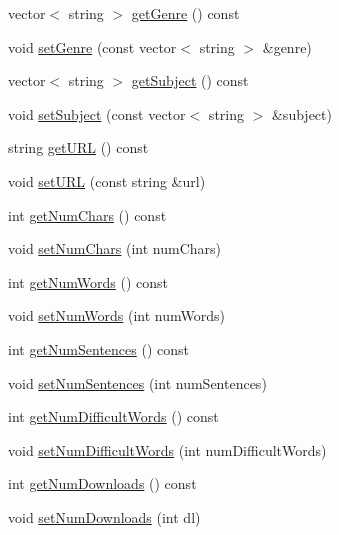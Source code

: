 \begin{DoxyCompactItemize}
\item 
vector$<$ string $>$ \mbox{\hyperlink{classbridges_1_1dataset_1_1_gutenberg_book_abee0e92b7936373301d01c67d9eb14e2}{get\+Genre}} () const
\item 
void \mbox{\hyperlink{classbridges_1_1dataset_1_1_gutenberg_book_a2b0787215311029297ffab97c56d2eaa}{set\+Genre}} (const vector$<$ string $>$ \&genre)
\item 
vector$<$ string $>$ \mbox{\hyperlink{classbridges_1_1dataset_1_1_gutenberg_book_ad84630cbd83ed0eca40e5008d43cf7d6}{get\+Subject}} () const
\item 
void \mbox{\hyperlink{classbridges_1_1dataset_1_1_gutenberg_book_a88a49679dcbb7992c9c526f4d6f3049b}{set\+Subject}} (const vector$<$ string $>$ \&subject)
\item 
string \mbox{\hyperlink{classbridges_1_1dataset_1_1_gutenberg_book_a74893ce58a9bc24d41d51c14c0f7e816}{get\+U\+RL}} () const
\item 
void \mbox{\hyperlink{classbridges_1_1dataset_1_1_gutenberg_book_aaa548eeb0e8512f95e3e0ea2bf6d7e9f}{set\+U\+RL}} (const string \&url)
\item 
int \mbox{\hyperlink{classbridges_1_1dataset_1_1_gutenberg_book_a79b1515db41bce12b1819af5d1c90006}{get\+Num\+Chars}} () const
\item 
void \mbox{\hyperlink{classbridges_1_1dataset_1_1_gutenberg_book_a5e4ccbb36137567c4b28accf83300920}{set\+Num\+Chars}} (int num\+Chars)
\item 
int \mbox{\hyperlink{classbridges_1_1dataset_1_1_gutenberg_book_a5a2042c0a79338f12192a47d093d16fd}{get\+Num\+Words}} () const
\item 
void \mbox{\hyperlink{classbridges_1_1dataset_1_1_gutenberg_book_a4ff46e5a2873feec4c0e6b773320bed5}{set\+Num\+Words}} (int num\+Words)
\item 
int \mbox{\hyperlink{classbridges_1_1dataset_1_1_gutenberg_book_ae1a96947459fbc978e2bb4b3f7e767a0}{get\+Num\+Sentences}} () const
\item 
void \mbox{\hyperlink{classbridges_1_1dataset_1_1_gutenberg_book_a6b02a1584f47b34389ce2c9fe71129c6}{set\+Num\+Sentences}} (int num\+Sentences)
\item 
int \mbox{\hyperlink{classbridges_1_1dataset_1_1_gutenberg_book_a7dbcb4a45d2c5d607b7b5231eb4e970b}{get\+Num\+Difficult\+Words}} () const
\item 
void \mbox{\hyperlink{classbridges_1_1dataset_1_1_gutenberg_book_a1cf0c2c558c414b1f5cfc04d00ae9128}{set\+Num\+Difficult\+Words}} (int num\+Difficult\+Words)
\item 
int \mbox{\hyperlink{classbridges_1_1dataset_1_1_gutenberg_book_a41bb0239e0b3f98848b2051401ee3a28}{get\+Num\+Downloads}} () const
\item 
void \mbox{\hyperlink{classbridges_1_1dataset_1_1_gutenberg_book_aacf716498f942400c65fdc3068008f61}{set\+Num\+Downloads}} (int dl)
\end{DoxyCompactItemize}


